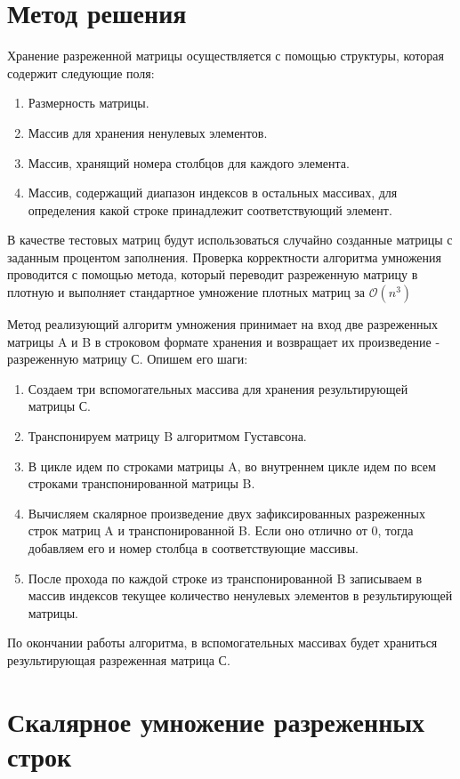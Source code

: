 \documentclass{report}
\begin{document}
\section*{Метод решения}
Хранение разреженной матрицы осуществляется с помощью структуры, которая содержит следующие поля:
\begin{enumerate}
\item Размерность матрицы.
\item Массив для хранения ненулевых элементов.
\item Массив, хранящий номера столбцов для каждого элемента.
\item Массив, содержащий диапазон индексов в остальных массивах, для определения какой строке принадлежит соответствующий элемент.
\end{enumerate}
В качестве тестовых матриц будут использоваться случайно созданные матрицы с заданным процентом заполнения. Проверка корректности алгоритма умножения проводится с помощью метода, который переводит разреженную матрицу в плотную и выполняет стандартное умножение плотных матриц за $\mathcal{O}(n^3)$

\par Метод реализующий алгоритм умножения принимает на вход две разреженных матрицы A и B в строковом формате хранения и возвращает их произведение - разреженную матрицу С. Опишем его шаги:
\begin{enumerate}
\item Создаем три вспомогательных массива для хранения результирующей матрицы С.
\item Транспонируем матрицу B алгоритмом Густавсона.
\item В цикле идем по строками матрицы A, во внутреннем цикле идем по всем строками транспонированной матрицы B.
\item Вычисляем скалярное произведение двух зафиксированных разреженных строк матриц A и транспонированной B. Если оно отлично от 0, тогда добавляем его и номер столбца в соответствующие массивы.
\item После прохода по каждой строке из транспонированной B записываем в массив индексов текущее количество ненулевых элементов в результирующей матрицы.
\end{enumerate}
По окончании работы алгоритма, в вспомогательных массивах будет храниться результирующая разреженная матрица С.

\newpage

\section*{Скалярное умножение разреженных строк}
\end{document}
